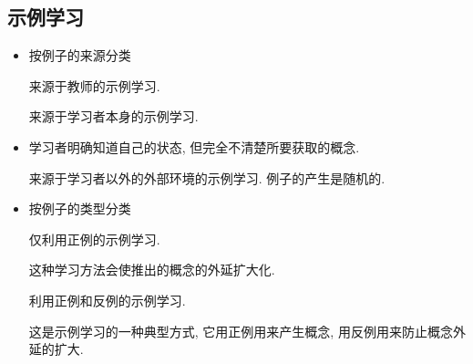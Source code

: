 \subsection{示例学习}
\begin{itemize}
\item 按例子的来源分类

  \qquad  {} 来源于教师的示例学习.

  \qquad  {} 来源于学习者本身的示例学习.
\item 学习者明确知道自己的状态, 但完全不清楚所要获取的概念.

    \qquad  {} 来源于学习者以外的外部环境的示例学习. 例子的产生是随机的.
\item 按例子的类型分类

    \qquad  {} 仅利用正例的示例学习.

    \qquad  \qquad 这种学习方法会使推出的概念的外延扩大化.

    \qquad  {} 利用正例和反例的示例学习.

    \qquad  \qquad  这是示例学习的一种典型方式, 它用正例用来产生概念, 用反例用来防止概念外延的扩大.
\end{itemize}
